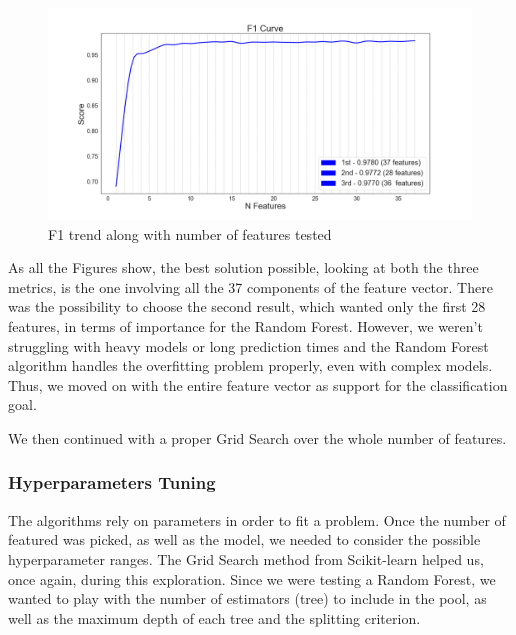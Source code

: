 \begin{figure}[htp!]
	\centering
	\includegraphics[width=\columnwidth]{chapter5/figure/f1_along_features.png}
	\caption{F1 trend along with number of features tested}
	\label{fig:feat_f1}
\end{figure}

As all the Figures show, the best solution possible, looking at both the three metrics, is the one involving all the 37 components of the feature vector.
There was the possibility to choose the second result, which wanted only the first 28 features, in terms of importance for the Random Forest. However, we weren't struggling with heavy models or long prediction times and the Random Forest algorithm handles the overfitting problem properly, even with complex models.
Thus, we moved on with the entire feature vector as support for the classification goal.

We then continued with a proper Grid Search over the whole number of features.
\subsubsection{Hyperparameters Tuning}
The algorithms rely on parameters in order to fit a problem.
Once the number of featured was picked, as well as the model, we needed to consider the possible hyperparameter ranges. 
The Grid Search method from Scikit-learn helped us, once again, during this exploration.
Since we were testing a Random Forest, we wanted to play with the number of estimators (tree) to include in the pool, as well as the maximum depth of each tree and the splitting criterion.


